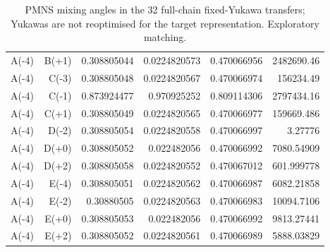 \begin{table}[htbp]
\begin{tabular}{lrrrrr}
A(-4) & B(+1) & 0.308805044 & 0.0224820573 & 0.470066956 & 2482690.46 \\
A(-4) & C(-3) & 0.308805048 & 0.0224820567 & 0.470066974 & 156234.49 \\
A(-4) & C(-1) & 0.873924477 & 0.970925252 & 0.809114306 & 2797434.16 \\
A(-4) & C(+1) & 0.308805049 & 0.0224820565 & 0.470066977 & 159669.486 \\
A(-4) & D(-2) & 0.308805054 & 0.0224820558 & 0.470066997 & 3.27776 \\
A(-4) & D(+0) & 0.308805052 & 0.022482056 & 0.470066992 & 7080.54909 \\
A(-4) & D(+2) & 0.308805058 & 0.0224820552 & 0.470067012 & 601.999778 \\
A(-4) & E(-4) & 0.308805051 & 0.0224820562 & 0.470066987 & 6082.21858 \\
A(-4) & E(-2) & 0.30880505 & 0.0224820563 & 0.470066983 & 10094.7106 \\
A(-4) & E(+0) & 0.308805053 & 0.022482056 & 0.470066992 & 9813.27441 \\
A(-4) & E(+2) & 0.308805052 & 0.0224820561 & 0.470066989 & 5888.03829 \\
\hline
\end{tabular}
\caption{PMNS mixing angles in the 32 full-chain fixed-Yukawa transfers; Yukawas are not reoptimised for the target representation. Exploratory matching.}
\label{tab:generalised_b3}
\end{table}
